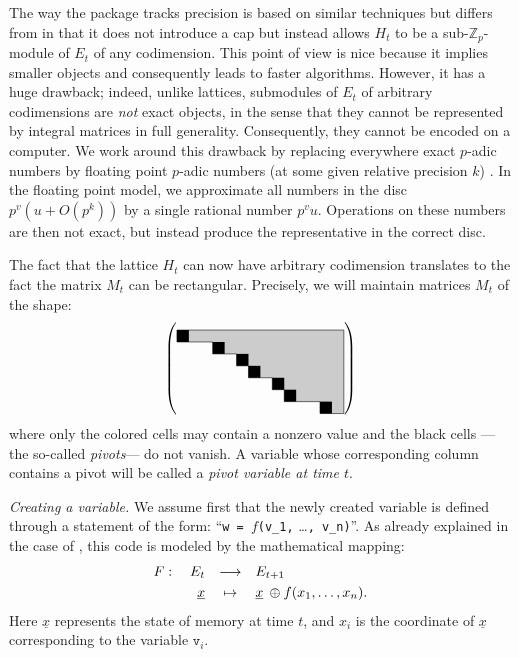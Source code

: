 \documentclass[sigconf]{acmart}
\newcommand{\Z}{\mathbb Z}
\newcommand{\Zp}{\Z_p}
\newcommand{\ttv}{\texttt{v}\xspace}
\newcommand{\ZpLC}{\text{\color{output} \rm \tt ZpLC}\xspace}
\newcommand{\ZpLF}{\text{\color{output} \rm \tt ZpLF}\xspace}
\theoremstyle{definition}
\begin{document}
The way the package \ZpLF tracks precision is based on similar 
techniques but differs from \ZpLC in that it does not introduce a cap 
but instead allows $H_t$ to be a sub-$\Zp$-module of $E_t$ of any 
codimension.
This point of view is nice because it implies smaller objects and 
consequently leads to faster algorithms. However, it has a huge 
drawback; indeed, unlike lattices, submodules of $E_t$ of arbitrary 
codimensions are \emph{not} exact objects, in the sense that they cannot 
be represented by integral matrices in full generality. Consequently,
they cannot be encoded on a computer.
We work around this drawback by replacing everywhere exact $p$-adic 
numbers by floating point $p$-adic numbers (at some given relative precision $k$) 
\cite{course-padic}.  In the floating point model, we approximate all
numbers in the disc $p^v(u + O(p^k))$ by a single rational number
$p^vu$.  Operations on these numbers are then not exact, but instead
produce the representative in the correct disc.

The fact that the lattice $H_t$ can now have arbitrary codimension
translates to the fact the matrix $M_t$ can be rectangular.
Precisely, we will maintain matrices $M_t$ of the shape:
\begin{equation}
\label{eq:shapeM-ZpLF}
\left(\raisebox{-0.5\height}{\begin{tikzpicture}[scale=0.3]
\fill[black!20] (0,0)--(0,-1)--(3,-1)--(3,-2)--(5,-2)--(5,-3)
    --(6,-3)--(6,-4)--(8,-4)--(8,-5)--(9,-5)--(9,-6)--(12,-6)
    --(12,-7)--(14,-7)--(14,0)--cycle;
\draw (0,0)--(0,-1)--(3,-1)--(3,-2)--(5,-2)--(5,-3)
    --(6,-3)--(6,-4)--(8,-4)--(8,-5)--(9,-5)--(9,-6)--(12,-6)
    --(12,-7)--(14,-7);
\fill (0,0) rectangle (1,-1);
\fill (3,-1) rectangle (4,-2);
\fill (5,-2) rectangle (6,-3);
\fill (6,-3) rectangle (7,-4);
\fill (8,-4) rectangle (9,-5);
\fill (9,-5) rectangle (10,-6);
\fill (12,-6) rectangle (13,-7);
\draw[thin] (14,-7)--(14,0)--(0,0);
\end{tikzpicture}}\right)
\end{equation}
where only the colored cells may contain a nonzero value and the 
black cells ---the so-called \emph{pivots}--- do not vanish. A
variable whose corresponding column contains a pivot will be called 
a \emph{pivot variable at time $t$}.


\medskip

\noindent \textit{Creating a variable.}
%
We assume first that the newly created variable is defined through a
statement of the form:
``\verb?w = ?$f$\verb?(v_1,? \ldots\verb?, v_n)?''.
As already explained in the case of \ZpLC, this code is 
modeled by the mathematical mapping:
$$\begin{array}{rcl}
F: \quad E_t & \longrightarrow & E_{t+1} \smallskip \\
\underline x & \mapsto & \underline x \:\oplus f(x_1, \ldots, x_n).
\end{array}$$
Here $\underline x$ represents the state of memory at time $t$, 
and $x_i$ is the coordinate of $\underline x$ corresponding to the
variable $\ttv_i$.
\end{document}
